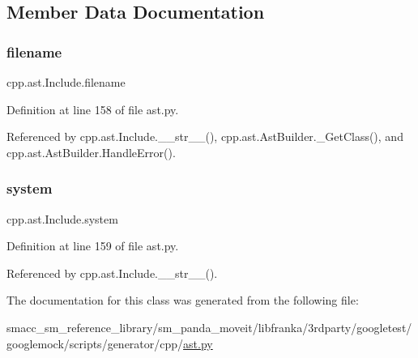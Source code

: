 \subsection{Member Data Documentation}
\mbox{\label{classcpp_1_1ast_1_1Include_a9ecff64f127655d3c17e9abe4ebe3852}} 
\subsubsection{\texorpdfstring{filename}{filename}}
{\footnotesize\ttfamily cpp.\+ast.\+Include.\+filename}



Definition at line 158 of file ast.\+py.



Referenced by cpp.\+ast.\+Include.\+\_\+\+\_\+str\+\_\+\+\_\+(), cpp.\+ast.\+Ast\+Builder.\+\_\+\+Get\+Class(), and cpp.\+ast.\+Ast\+Builder.\+Handle\+Error().

\mbox{\label{classcpp_1_1ast_1_1Include_a2e8e535b1af7d9b0ff94d0ae9f86e5c5}} 
\subsubsection{\texorpdfstring{system}{system}}
{\footnotesize\ttfamily cpp.\+ast.\+Include.\+system}



Definition at line 159 of file ast.\+py.



Referenced by cpp.\+ast.\+Include.\+\_\+\+\_\+str\+\_\+\+\_\+().



The documentation for this class was generated from the following file\+:\begin{DoxyCompactItemize}
\item 
smacc\+\_\+sm\+\_\+reference\+\_\+library/sm\+\_\+panda\+\_\+moveit/libfranka/3rdparty/googletest/googlemock/scripts/generator/cpp/\hyperlink{ast_8py}{ast.\+py}\end{DoxyCompactItemize}

